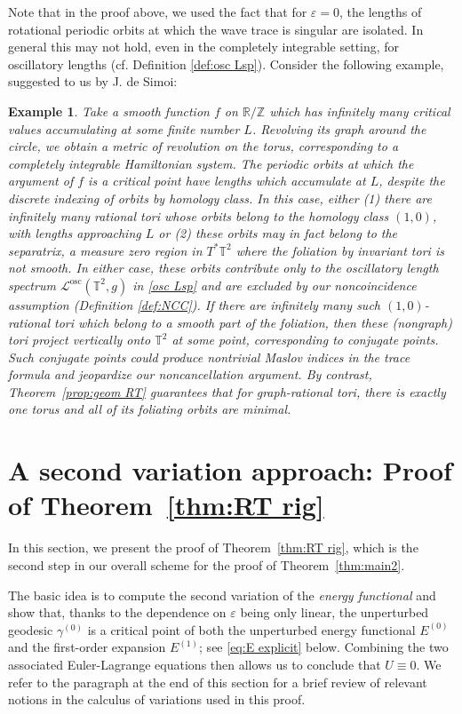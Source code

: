 \documentclass[11pt,letterpaper,oneside]{amsart}
\newcommand{\Z}{\mathbb{Z}}
\newcommand{\R}{\mathbb{R}}
\newcommand{\T}{\mathbb{T}}
\renewcommand{\epsilon}{\varepsilon}
\newtheorem{exa}[theo]{Example}
\theoremstyle{definition}
\theoremstyle{remark}
\newcommand{\eps}{\varepsilon}
\theoremstyle{definition}
\theoremstyle{remark}
\newcommand{\CL}{\mathcal{L}}
\DeclareMathOperator{\osc}{osc}
\begin{document}
Note that in the proof above, we used the fact that for $\eps = 0$, the lengths of rotational periodic orbits at which the wave trace is singular are isolated. In general this may not hold, even in the completely integrable setting, for oscillatory lengths (cf. Definition \ref{def:osc Lsp}). Consider the following example, suggested to us by J. de Simoi:
\begin{exa}
    Take a smooth function $f$ on $\R/\Z$ which has infinitely many critical values accumulating at some finite number $L$. Revolving its graph around the circle, we obtain a metric of revolution on the torus, corresponding to a completely integrable Hamiltonian system. The periodic orbits at which the argument of $f$ is a critical point have lengths which accumulate at $L$, despite the discrete indexing of orbits by homology class. In this case, either (1) there are infinitely many rational tori whose orbits belong to the homology class $(1,0)$, with lengths approaching $L$ or (2) these orbits may in fact belong to the separatrix, a measure zero region in $T^* \T^2$ where the foliation by invariant tori is not smooth. In either case, these orbits contribute only to the oscillatory length spectrum $\CL^{\osc} (\T^2,g)$ in \eqref{osc Lsp} and are excluded by our noncoincidence assumption (Definition \ref{def:NCC}). If there are infinitely many such $(1,0)$-rational tori which belong to a smooth part of the foliation, then these (nongraph) tori project vertically onto $\T^2$ at some point, corresponding to conjugate points. Such conjugate points could produce nontrivial Maslov indices in the trace formula and jeopardize our noncancellation argument. By contrast, Theorem~\ref{prop:geom RT} guarantees that for \textit{graph}-rational tori, there is exactly one torus and all of its foliating orbits are minimal.
\end{exa}






\section{A second variation approach: Proof of Theorem~\ref{thm:RT rig}} \label{sec:secondorder}


In this section, we present the proof of Theorem~\ref{thm:RT rig}, which is the second step in our overall scheme for the proof of Theorem~\ref{thm:main2}.

\medskip

The basic idea is to compute the second variation of the \emph{energy functional} and show that, thanks to the dependence on $\epsilon$ being only linear, the unperturbed geodesic $\gamma^{(0)}$ is a critical point of both the unperturbed energy functional $E^{(0)}$ and the first-order expansion $E^{(1)}$; see \eqref{eq:E explicit} below. Combining the two associated Euler-Lagrange equations then allows us to conclude that $U \equiv 0$.
We refer to the paragraph at the end of this section for a brief review of relevant notions in the calculus of variations used in this proof.
 
\end{document}
